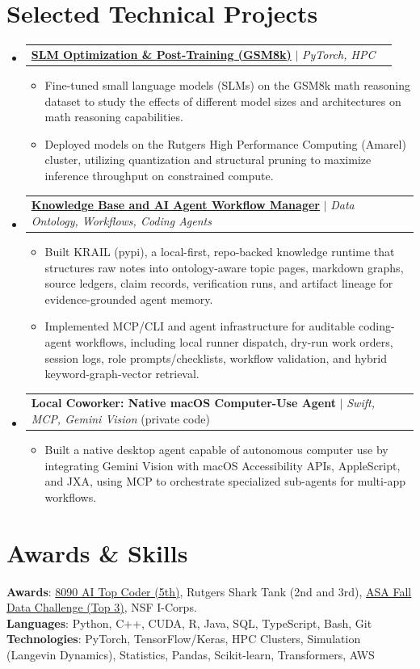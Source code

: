 \documentclass[letterpaper,11pt]{article}
\makeatletter
\newcommand{\resumeItem}[1]{
  \item\small{
    {#1 \vspace{-2pt}}
  }
}
\newcommand{\resumeProjectHeading}[2]{
    \item
    \begin{tabular*}{0.97\textwidth}{l@{\extracolsep{\fill}}r}
      \small#1 & #2 \\
    \end{tabular*}\vspace{-7pt}
}
\newcommand{\resumeSubHeadingListStart}{\begin{itemize}[leftmargin=0.15in, label={}]}
\newcommand{\resumeSubHeadingListEnd}{\end{itemize}}
\newcommand{\resumeItemListStart}{\begin{itemize}}
\newcommand{\resumeItemListEnd}{\end{itemize}\vspace{-5pt}}
\makeatother
\begin{document}
\section{Selected Technical Projects}
    \resumeSubHeadingListStart
      \resumeProjectHeading
          {\href{https://github.com/AkeBoss-tech/llm-research}{\textbf{SLM Optimization \& Post-Training (GSM8k)}} $|$ \emph{PyTorch, HPC}}{}
          \resumeItemListStart
            \resumeItem{Fine-tuned small language models (SLMs) on the GSM8k math reasoning dataset to study the effects of different model sizes and architectures on math reasoning capabilities.}
            \resumeItem{Deployed models on the Rutgers High Performance Computing (Amarel) cluster, utilizing quantization and structural pruning to maximize inference throughput on constrained compute.}
          \resumeItemListEnd

      \resumeProjectHeading
          {\href{https://github.com/AkeBoss-tech/knowledge}{\textbf{Knowledge Base and AI Agent Workflow Manager}} $|$ \emph{Data Ontology, Workflows, Coding Agents} }{}
          \resumeItemListStart
            \resumeItem{Built KRAIL (pypi), a local-first, repo-backed knowledge runtime that structures raw notes into ontology-aware topic pages, markdown graphs, source ledgers, claim records, verification runs, and artifact lineage for evidence-grounded agent memory.}
            \resumeItem{Implemented MCP/CLI and agent infrastructure for auditable coding-agent workflows, including local runner dispatch, dry-run work orders, session logs, role prompts/checklists, workflow validation, and hybrid keyword-graph-vector retrieval.}
          \resumeItemListEnd

      \resumeProjectHeading
          {\textbf{Local Coworker: Native macOS Computer-Use Agent} $|$ \emph{Swift, MCP, Gemini Vision} (private code)}{}
          \resumeItemListStart
            \resumeItem{Built a native desktop agent capable of autonomous computer use by integrating Gemini Vision with macOS Accessibility APIs, AppleScript, and JXA, using MCP to orchestrate specialized sub-agents for multi-app workflows.}
          \resumeItemListEnd

    \resumeSubHeadingListEnd
\section{Awards \& Skills}
 \begin{itemize}[leftmargin=0.15in, label={}]
    \small{\item{
     \textbf{Awards}{: \href{https://github.com/AkeBoss-tech/top-coder-challenge}{8090 AI Top Coder (5th)}, Rutgers Shark Tank (2nd and 3rd), \href{https://acashmoney.biz/portfolio/asa-fall-data/}{ASA Fall Data Challenge (Top 3)}, NSF I-Corps.} \\
     \textbf{Languages}{: Python, C++, CUDA, R, Java, SQL, TypeScript, Bash, Git} \\
     \textbf{Technologies}{: PyTorch, TensorFlow/Keras, HPC Clusters, Simulation (Langevin Dynamics), Statistics, Pandas, Scikit-learn, Transformers, AWS}
    }}
 \end{itemize}
\end{document}
